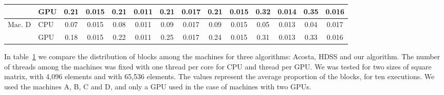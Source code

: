 \documentclass[journal]{IEEEtran}
\begin{document}
\begin{table}[htb]
\begin{scriptsize}
\begin{tabular}{|l|l|l|l|l|l|l|l|l|l|l|l|l|l|}
\cline{2-14}
 & GPU & \multicolumn{1}{c|}{0.21} & \multicolumn{1}{c|}{0.015} & \multicolumn{1}{c|}{0.21} & \multicolumn{1}{c|}{0.011} & \multicolumn{1}{c|}{0.21} & \multicolumn{1}{c|}{0.017} & \multicolumn{1}{c|}{0.21} & \multicolumn{1}{c|}{0.015} & \multicolumn{1}{c|}{0.32} & \multicolumn{1}{c|}{0.014} & \multicolumn{1}{c|}{0.35} & \multicolumn{1}{c|}{0.016} \\ 
\hline
Mac. D & CPU & \multicolumn{1}{c|}{0.07} & \multicolumn{1}{c|}{0.015} & \multicolumn{1}{c|}{0.08} & \multicolumn{1}{c|}{0.011} & \multicolumn{1}{c|}{0.09} & \multicolumn{1}{c|}{0.017} & \multicolumn{1}{c|}{0.09} & \multicolumn{1}{c|}{0.015} & \multicolumn{1}{c|}{0.05} & \multicolumn{1}{c|}{0.013} & \multicolumn{1}{c|}{0.04} & \multicolumn{1}{c|}{0.017} \\ 
\cline{2-14}
 & GPU & \multicolumn{1}{c|}{0.18} & \multicolumn{1}{c|}{0.015} & \multicolumn{1}{c|}{0.22} & \multicolumn{1}{c|}{0.011} & \multicolumn{1}{c|}{0.25} & \multicolumn{1}{c|}{0.017} & \multicolumn{1}{c|}{0.24} & \multicolumn{1}{c|}{0.015} & \multicolumn{1}{c|}{0.31} & \multicolumn{1}{c|}{0.013} & \multicolumn{1}{c|}{0.33} & \multicolumn{1}{c|}{0.016} \\ 
\hline
\end{tabular}
\end{scriptsize}
\label{table: comparativoBlocos}
\end{table}

In table~\ref{table: comparativoBlocos}  we compare the distribution of blocks among the machines for three algorithms: Acosta, HDSS and our algorithm. The number of threads among the machines was fixed with one thread per core for CPU and thread per GPU. We was tested for two sizes of square matrix, with 4,096 elements  and with 65,536 elements. The values ​​represent the average proportion of the blocks, for ten executions. We used the machines A, B, C and D, and only a GPU used in the case of machines with two GPUs.
\end{document}
